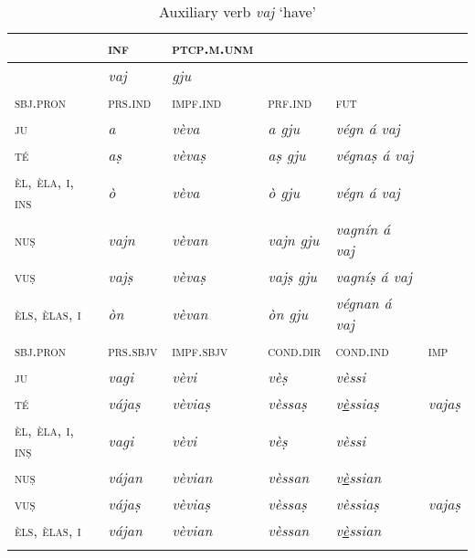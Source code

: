 \begin{table}
\caption{Auxiliary verb \textit{vaj} `have'}
\label{tab:aux:vaj}
 \begin{tabular}{llllll}
 
  \lsptoprule
& \textsc{inf}  & \textsc{ptcp.m.unm} \\
  \midrule
&  \textit{vaj} &\textit{gju} \\
     
  \lsptoprule
\textsc{sbj.pron}  &\textsc{prs.ind}  &\textsc{impf.ind} & \textsc{prf.ind} & \textsc{fut}\\
   \midrule
\textsc{ju} &\textit{a} & \textit{vèva} & \textit{a gju} & \textit{végn á vaj}\\
\textsc{té} &\textit{aṣ} & \textit{vèvaṣ} & \textit{aṣ gju} & \textit{végnaṣ á vaj}\\
\textsc{èl, èla, i, ins} &\textit{ò} & \textit{vèva} & \textit{ò gju} &\textit{végn á vaj}\\
\textsc{nuṣ} &\textit{vajn} & \textit{vèvan} & \textit{vajn gju} &\textit{vagnín á vaj}\\
\textsc{vuṣ} &\textit{vajṣ} & \textit{vèvaṣ} & \textit{vajṣ gju} &\textit{vagníṣ á vaj}\\
\textsc{èls, èlas, i}& \textit{òn} & \textit{vèvan} & \textit{òn gju} &\textit{végnan á vaj}\\

 \lsptoprule
\textsc{sbj.pron}  &\textsc{prs.sbjv} & \textsc{impf.sbjv}  &\textsc{cond.dir} & \textsc{cond.ind} & \textsc{imp} \\
\midrule
\textsc{ju} & \textit{vagi}& \textit{vèvi} & \textit{vèṣ} & \textit{vèssi}\\
\textsc{té} & \textit{vájaṣ}& \textit{vèviaṣ} & \textit{vèssaṣ} & \textit{v\underline{è}ssiaṣ} &  \textit{vajaṣ}\\
\textsc{èl, èla, i, inṣ} & \textit{vagi} & \textit{vèvi} & \textit{vèṣ} & \textit{vèssi}\\
\textsc{nuṣ} & \textit{vájan}& \textit{vèvian} & \textit{vèssan} & \textit{v\underline{è}ssian}\\
\textsc{vuṣ} & \textit{vájaṣ}& \textit{vèviaṣ} & \textit{vèssaṣ}& \textit{vèssiaṣ} &  \textit{vajaṣ}\\
\textsc{èls, èlas, i} & \textit{vájan}& \textit{vèvian} & \textit{vèssan} & \textit{v\underline{è}ssian}\\
  \lspbottomrule
 \end{tabular}
\end{table}

